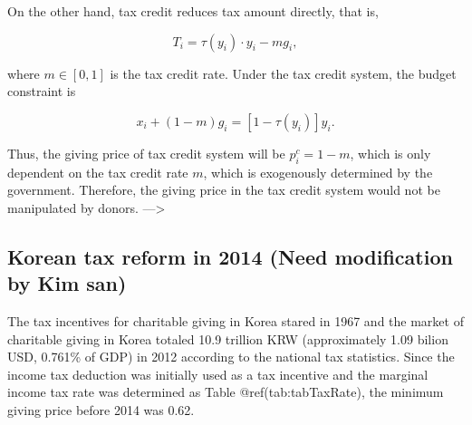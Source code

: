 \documentclass[
]{article}
\begin{document}
On the other hand, tax credit reduces tax amount directly, that is,

\[
    T_i = \tau(y_i)\cdot y_i - m g_i,
\]

where \(m \in [0, 1]\) is the tax credit rate. Under the tax credit system, the budget constraint is

\[
    x_i + (1 - m) g_i = [1 - \tau(y_i)] y_i.
\]

Thus, the giving price of tax credit system will be \(p_i^c = 1 - m\), which is only dependent on the tax credit rate \(m\), which is exogenously determined by the government.
Therefore, the giving price in the tax credit system would not be manipulated by donors.
---\textgreater{}

\hypertarget{korean-tax-reform-in-2014-need-modification-by-kim-san}{%
\subsection{Korean tax reform in 2014 (Need modification by Kim san)}\label{korean-tax-reform-in-2014-need-modification-by-kim-san}}

The tax incentives for charitable giving in Korea stared in 1967 and the market of charitable giving in Korea totaled 10.9 trillion KRW (approximately 1.09 bilion USD, 0.761\% of GDP) in 2012 according to the national tax statistics.
Since the income tax deduction was initially used as a tax incentive and the marginal income tax rate was determined as Table @ref(tab:tabTaxRate), the minimum giving price before 2014 was 0.62.
\end{document}
